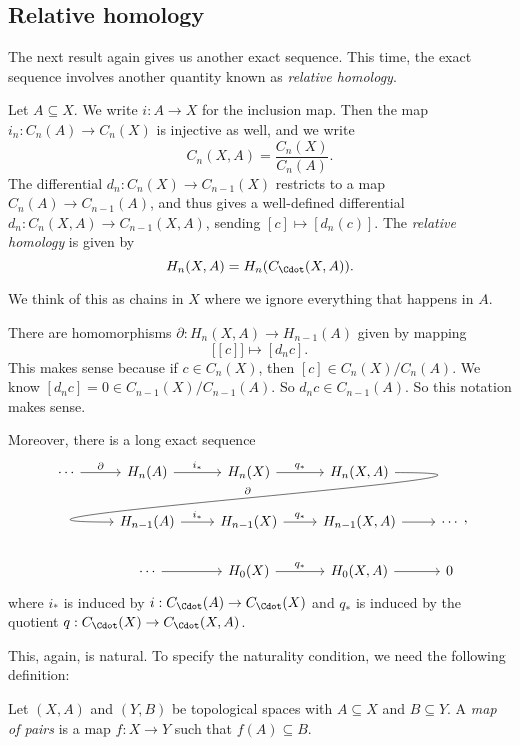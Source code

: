 \documentclass[a4paper]{article}
\begin{document}
\subsection{Relative homology}
The next result again gives us another exact sequence. This time, the exact sequence involves another quantity known as \emph{relative homology}.

\begin{defi}
  Let $A \subseteq X$. We write $i: A \to X$ for the inclusion map. Then the map $i_n: C_n(A) \to C_n(X)$ is injective as well, and we write
  \[
    C_n(X, A) = \frac{C_n(X)}{C_n(A)}.
  \]
  The differential $d_n: C_n(X) \to C_{n - 1}(X)$ restricts to a map $C_n(A) \to C_{n - 1}(A)$, and thus gives a well-defined differential $d_n: C_n(X, A) \to C_{n - 1}(X, A)$, sending $[c] \mapsto [d_n(c)]$. The \emph{relative homology} is given by
  \[
    H_n(X, A) = H_n(C_{\Cdot}(X, A)).
  \]
\end{defi}
We think of this as chains in $X$ where we ignore everything that happens in $A$.

\begin{thm}
  There are homomorphisms $\partial: H_n(X, A) \to H_{n - 1}(A)$ given by mapping
  \[
    \big[[c]\big] \mapsto [d_n c].
  \]
  This makes sense because if $c \in C_n(X)$, then $[c] \in C_n(X)/C_n(A)$. We know $[d_n c] = 0 \in C_{n - 1}(X)/C_{n - 1}(A)$. So $d_n c \in C_{n - 1}(A)$. So this notation makes sense.

  Moreover, there is a long exact sequence
  \[
    \begin{tikzcd}
      \cdots \ar[r, "\partial"] & H_n(A) \ar[r, "i_*"] & H_n(X) \ar[r, "q_*"] & H_n(X, A)\ar[out=0, in=180, looseness=2, overlay, lld, "\partial"']\\
      & H_{n - 1}(A) \ar[r, "i_*"] & H_{n - 1}(X) \ar[r, "q_*"] & H_{n - 1}(X, A) \ar [r] & \cdots\\
      &\cdots \ar[r] & H_0(X) \ar[r, "q_*"] & H_0(X, A) \ar [r] & 0
    \end{tikzcd},
  \]
  where $i_*$ is induced by $i: C_{\Cdot}(A) \to C_{\Cdot}(X)$ and $q_*$ is induced by the quotient $q: C_{\Cdot}(X) \to C_{\Cdot}(X, A)$.
\end{thm}

This, again, is natural. To specify the naturality condition, we need the following definition:
\begin{defi}
  Let $(X, A)$ and $(Y, B)$ be topological spaces with $A \subseteq X$ and $B \subseteq Y$. A \emph{map of pairs} is a map $f: X \to Y$ such that $f(A) \subseteq B$.
\end{defi}
\end{document}
